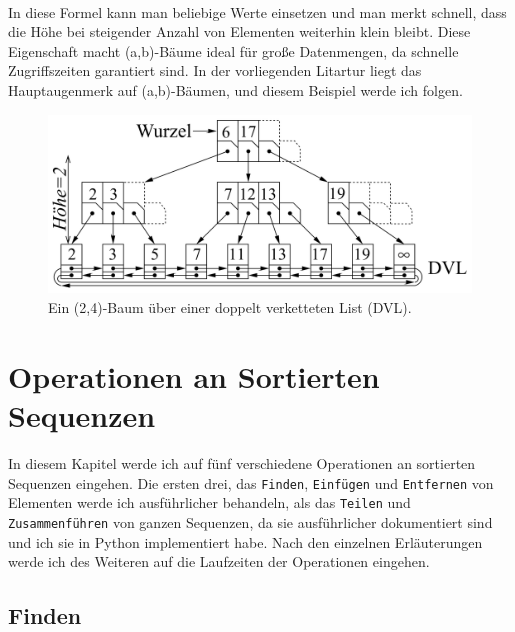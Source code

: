 \\
In diese Formel kann man beliebige Werte einsetzen und man merkt schnell, dass die Höhe bei steigender Anzahl von Elementen weiterhin klein bleibt. Diese Eigenschaft macht (a,b)-Bäume ideal für große Datenmengen, da schnelle Zugriffszeiten garantiert sind. In der vorliegenden Litartur liegt das Hauptaugenmerk auf (a,b)-Bäumen, und diesem Beispiel werde ich folgen.

\begin{figure}
    \begin{center}
        \includegraphics[width=0.8\linewidth]{assets/24tree.png}
        \caption{Ein (2,4)-Baum über einer doppelt verketteten List (DVL).\\\cite{Sanders:19}}
        \label{fig:24Tree}
    \end{center}
\end{figure}


\chapter{Operationen an Sortierten Sequenzen}
\label{chapter:operations}

In diesem Kapitel werde ich auf fünf verschiedene Operationen an sortierten Sequenzen eingehen. Die ersten drei, das \texttt{Finden}, \texttt{Einfügen} und \texttt{Entfernen} von Elementen werde ich ausführlicher behandeln, als das \texttt{Teilen} und \texttt{Zusammenführen} von ganzen Sequenzen, da sie ausführlicher dokumentiert sind und ich sie in Python implementiert habe. Nach den einzelnen Erläuterungen werde ich des Weiteren auf die Laufzeiten der Operationen eingehen.

\section{Finden}
\label{section:locate}

